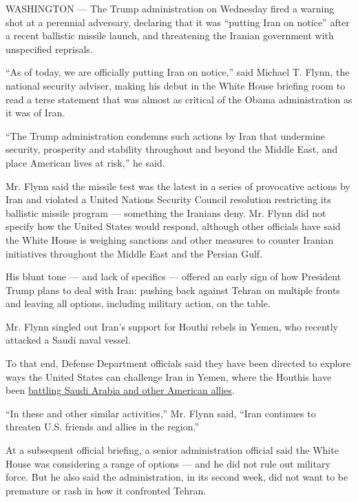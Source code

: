 WASHINGTON --- The Trump administration on Wednesday fired a warning
shot at a perennial adversary, declaring that it was ``putting Iran on
notice'' after a recent ballistic missile launch, and threatening the
Iranian government with unspecified reprisals.

``As of today, we are officially putting Iran on notice,'' said Michael
T. Flynn, the national security adviser, making his debut in the White
House briefing room to read a terse statement that was almost as
critical of the Obama administration as it was of Iran.

``The Trump administration condemns such actions by Iran that undermine
security, prosperity and stability throughout and beyond the Middle
East, and place American lives at risk,'' he said.

Mr. Flynn said the missile test was the latest in a series of
provocative actions by Iran and violated a United Nations Security
Council resolution restricting its ballistic missile program ---
something the Iranians deny. Mr. Flynn did not specify how the United
States would respond, although other officials have said the White House
is weighing sanctions and other measures to counter Iranian initiatives
throughout the Middle East and the Persian Gulf.

His blunt tone --- and lack of specifics --- offered an early sign of
how President Trump plans to deal with Iran: pushing back against Tehran
on multiple fronts and leaving all options, including military action,
on the table.

Mr. Flynn singled out Iran's support for Houthi rebels in Yemen, who
recently attacked a Saudi naval vessel.

To that end, Defense Department officials said they have been directed
to explore ways the United States can challenge Iran in Yemen, where the
Houthis have been
\href{https://www.nytimes3xbfgragh.onion/interactive/2016/10/14/world/middleeast/yemen-saudi-arabia-us-airstrikes.html}{battling
Saudi Arabia and other American allies}.

``In these and other similar activities,'' Mr. Flynn said, ``Iran
continues to threaten U.S. friends and allies in the region.''

At a subsequent official briefing, a senior administration official said
the White House was considering a range of options --- and he did not
rule out military force. But he also said the administration, in its
second week, did not want to be premature or rash in how it confronted
Tehran.


